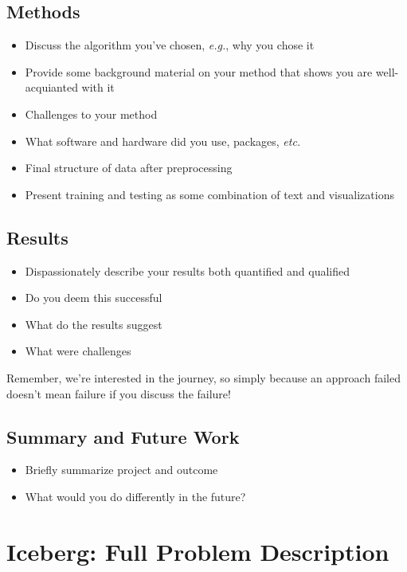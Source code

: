 \documentclass[fleqn,10pt]{SelfArx} %
\begin{document}
\subsection{Methods}
\begin{itemize}[noitemsep]
\item Discuss the algorithm you've chosen, \textit{e.g.}, why you chose it
\item Provide some background material on your method that shows you are well-acquianted with it
\item Challenges to your method
\item What software and hardware did you use, packages, \textit{etc.}
\item Final structure of data after preprocessing
\item Present training and testing as some combination of text and visualizations
\end{itemize}


\subsection{Results}
\begin{itemize}[noitemsep]
\item Dispassionately describe your results both quantified and qualified
\item Do you deem this successful
\item What do the results suggest
\item What were challenges
\end{itemize}
Remember, we're interested in the journey, so simply because an approach failed doesn't mean failure if you discuss the failure!
\subsection{Summary and Future Work}
\begin{itemize}[noitemsep]
\item Briefly summarize project and outcome
\item What would you do differently in the future?
\end{itemize}

\lipsum[10] %
\section{Iceberg: Full Problem Description}
\end{document}
